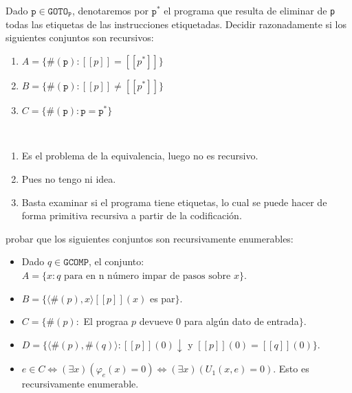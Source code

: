\documentclass[twoside]{article}
\begin{document}
\begin{ejercicio}{12}
Dado $\texttt{p} \in \texttt{GOTO}_\texttt{P}$, denotaremos por $\texttt{p}^*$ el programa que resulta de eliminar de \texttt{p} todas
las etiquetas de las instrucciones etiquetadas. Decidir razonadamente si los siguientes conjuntos
son recursivos:
\begin{enumerate}
\item $A = \{\#(\texttt{p}) : [\![p]\!] = [\![p^*]\!]\}$
\item  $B = \{\#(\texttt{p}) : [\![p]\!] \neq [\![p^*]\!]\}$
\item $C = \{\#(\texttt{p}) : \texttt{p} = \texttt{p}^*\}$
\end{enumerate}
\end{ejercicio}
\begin{solucion}\
\begin{enumerate}
\item Es el problema de la equivalencia, luego no es recursivo. 
\item Pues no tengo ni idea.
\item Basta examinar si el programa tiene etiquetas, lo cual se puede hacer de forma primitiva recursiva a partir de la codificación.
\end{enumerate}
\end{solucion}

\newpage

\begin{ejercicio}{14}
probar que los siguientes conjuntos son recursivamente enumerables:
\begin{itemize}
	\item Dado $q \in \texttt{GCOMP}$, el conjunto: $A = \{ x : q \text{ para en n número impar de pasos sobre }x\}$.
	\item $B = \{\langle \#(p),x\rangle  [[p]](x)$ es par$\}$.
	\item $C = \{\#(p) : $ El prograa $p$ devueve $0$ para algún dato de entrada$\}$.
	\item $D = \{\langle\#(p),\#(q)\rangle : [[p]](0)\downarrow $ y $[[p]](0)=[[q]](0)\}$.
\end{itemize}
\end{ejercicio}
\begin{solucion}\mbox{}
\begin{itemize}
	\item $e \in C \Leftrightarrow (\exists x) (φ_e(x) = 0) \Leftrightarrow (\exists x)(U_1(x,e) = 0)$.
	Esto es recursivamente enumerable.
\end{itemize}
\end{solucion}
\end{document}
